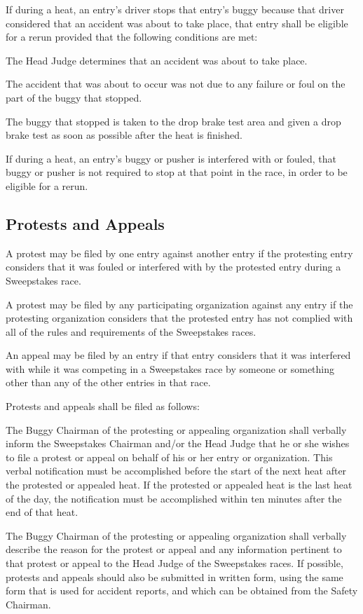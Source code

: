 If during a heat, an entry's driver stops that entry's buggy because that driver considered that an accident was about to take place, that entry shall be eligible for a rerun provided that the following conditions are met:

The Head Judge determines that an accident was about to take place.

The accident that was about to occur was not due to any failure or foul on the part of the buggy that stopped.

The buggy that stopped is taken to the drop brake test area and given a drop brake test as soon as possible after the heat is finished.

If during a heat, an entry's buggy or pusher is interfered with or fouled, that buggy or pusher is not required to stop at that point in the race, in order to be eligible for a rerun.

\subsection{Protests and Appeals}

A protest may be filed by one entry against another entry if the protesting entry considers that it was fouled or interfered with by the protested entry during a Sweepstakes race.

A protest may be filed by any participating organization against any entry if the protesting organization considers that the protested entry has not complied with all of the rules and requirements of the Sweepstakes races.

An appeal may be filed by an entry if that entry considers that it was interfered with while it was competing in a Sweepstakes race by someone or something other than any of the other entries in that race.

Protests and appeals shall be filed as follows:

The Buggy Chairman of the protesting or appealing organization shall verbally inform the Sweepstakes Chairman and/or the Head Judge that he or she wishes to file a protest or appeal on behalf of his or her entry or organization. This verbal notification must be accomplished before the start of the next heat after the protested or appealed heat. If the protested or appealed heat is the last heat of the day, the notification must be accomplished within ten minutes after the end of that heat.

The Buggy Chairman of the protesting or appealing organization shall verbally describe the reason for the protest or appeal and any information pertinent to that protest or appeal to the Head Judge of the Sweepstakes races. If possible, protests and appeals should also be submitted in written form, using the same form that is used for accident reports, and which can be obtained from the Safety Chairman.

